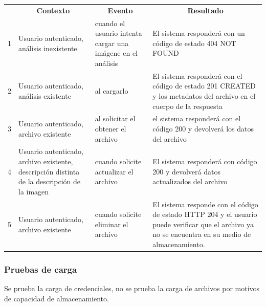 \begin{center}
\begin{longtable}{|m{0.5cm}|p{4cm}|p{4cm}|p{4.5cm}|}

	\hline 
		\rowcolor[gray]{0.9} 
		\multicolumn{4}{|c|}{\textbf{Criterio de aceptación}} \\
	\hline
    	\rowcolor[gray]{0.9} 
    	\multicolumn{1}{|c}{\textbf{Id}} & \multicolumn{1}{|c}{\textbf{Contexto}} &  \multicolumn{1}{|c}{\textbf{Evento}} & \multicolumn{1}{|c|}{\textbf{Resultado}} \\
    \hline
    	
1&Usuario autenticado, análisis inexistente & cuando el usuario intenta cargar una imágene en el análisis & El sistema responderá con un código de estado 404 NOT FOUND\\ \hline
 
2& Usuario autenticado, análisis existente   & al cargarlo & El sistema responderá con el código de estado 201 CREATED y los metadatos del archivo en el cuerpo de la respuesta\\ \hline

3& Usuario autenticado, archivo existente & al solicitar el obtener el archivo & el sistema responderá con el código 200 y devolverá los datos del archivo\\ \hline

4& Usuario autenticado, archivo existente, descripción distinta de la descripción de la imagen & cuando solicite actualizar el archivo & El sistema responderá con código 200 y devolverá datos actualizados del archivo\\ \hline

5& Usuario autenticado, archivo existente & cuando solicite eliminar el archivo & El sistema responde con el código de estado HTTP 204 y el usuario puede verificar que el archivo ya no se encuentra en su medio de almacenamiento.\\ \hline

  \end{longtable}
\end{center}



\clearpage
\subsubsection{Pruebas de carga}

Se prueba la carga de credenciales, no se prueba la carga de archivos por motivos de capacidad de almacenamiento.

